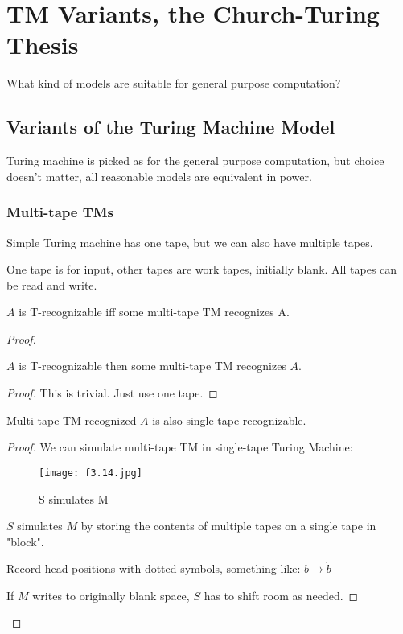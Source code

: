\chapter{TM Variants, the Church-Turing Thesis}

\begin{note}
    What kind of models are suitable for general purpose computation?
\end{note}

\section{Variants of the Turing Machine Model}

Turing machine is picked as for the general purpose computation, but choice doesn't matter, all reasonable models are equivalent in power.

\subsection{Multi-tape TMs}

Simple Turing machine has one tape, but we can also have multiple tapes.

One tape is for input, other tapes are work tapes, initially blank. All tapes can be read and write.

\begin{theorem}
    \(A\) is T-recognizable iff some multi-tape TM recognizes A.
\end{theorem}
\begin{proof}
    \begin{lemma}
        \(A\) is T-recognizable then some multi-tape TM recognizes \(A\).  
    \end{lemma}
    \begin{proof}
        This is trivial. Just use one tape.
    \end{proof}

    \begin{lemma}
        Multi-tape TM recognized \(A\) is also single tape recognizable.
    \end{lemma}
    \begin{proof}
        We can simulate multi-tape TM in single-tape Turing Machine:

        \begin{figure}[H]
            \centering
            \texttt{[image: f3.14.jpg]}
            \caption{S simulates M}
        \end{figure}


        \(S\) simulates \(M\) by storing the contents of multiple tapes on a single tape in "block".

        Record head positions with dotted symbols, something like: \(b \rightarrow \dot{b}\) 

        If \(M\) writes to originally blank space, \(S\) has to shift room as needed. 
    \end{proof}
\end{proof}


